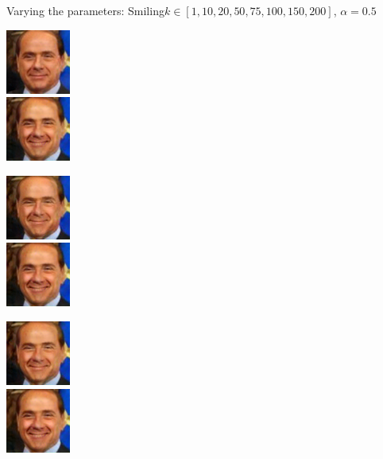 \documentclass[11pt]{beamer}
\begin{document}
\begin{frame}{Varying the parameters: Smiling}{$k \in [1, 10, 20, 50, 75, 100, 150, 200]$, $\alpha=0.5$}
	\centering
	\begin{minipage}{81px}
		\includegraphics[width=80px]{../pictures/outputs/alpha_k/Smiling/alpha0.4/Silvio_Berlusconi_0023_alpha-0.4_k-12017-02-07_14-07-41.png}\\
		\includegraphics[width=80px]{../pictures/outputs/alpha_k/Smiling/alpha0.4/Silvio_Berlusconi_0023_alpha-0.4_k-752017-02-07_14-13-59.png}
	\end{minipage}%
	\begin{minipage}{81px}
		\includegraphics[width=80px]{../pictures/outputs/alpha_k/Smiling/alpha0.4/Silvio_Berlusconi_0023_alpha-0.4_k-102017-02-07_14-09-14.png}\\
		\includegraphics[width=80px]{../pictures/outputs/alpha_k/Smiling/alpha0.4/Silvio_Berlusconi_0023_alpha-0.4_k-1002017-02-07_14-15-38.png}
	\end{minipage}%
	\begin{minipage}{81px}
		\includegraphics[width=80px]{../pictures/outputs/alpha_k/Smiling/alpha0.4/Silvio_Berlusconi_0023_alpha-0.4_k-202017-02-07_14-10-46.png}\\
		\includegraphics[width=80px]{../pictures/outputs/alpha_k/Smiling/alpha0.4/Silvio_Berlusconi_0023_alpha-0.4_k-1502017-02-07_14-17-20.png}

\end{minipage}
\end{frame}
\end{document}
